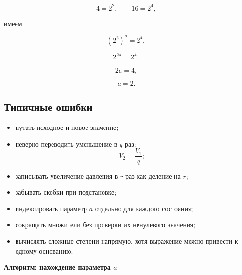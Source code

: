 \documentclass[a4paper,12pt]{article}
\newcommand{\subsect}[1]{%
  \subsection*{\color{accent}#1}%
}
\begin{document}
\[
4=2^2,
\qquad
16=2^4,
\]

имеем

\[
(2^2)^a=2^4,
\]

\[
2^{2a}=2^4,
\]

\[
2a=4,
\]

\[
a=2.
\]


\subsect{Типичные ошибки}

\begin{itemize}

  \item путать исходное и новое значение;

  \item неверно переводить уменьшение в $q$ раз:
  \[
  V_2=\frac{V_1}{q};
  \]

  \item записывать увеличение давления в $r$ раз как деление на $r$;

  \item забывать скобки при подстановке;

  \item индексировать параметр $a$ отдельно для каждого состояния;

  \item сокращать множители без проверки их ненулевого значения;

  \item вычислять сложные степени напрямую, хотя выражение можно
  привести к одному основанию.

\end{itemize}


\clearpage
\thispagestyle{empty}

\begin{center}

{\Large
\color{darkaccent}
\textbf{
Алгоритм: нахождение параметра $a$
}
}

\end{center}

\vspace{8mm}
\end{document}
